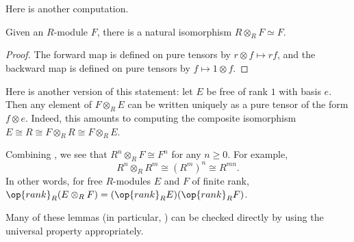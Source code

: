 \documentclass[../notes.tex]{subfiles}
\begin{document}
Here is another computation.
\begin{lemma} \label{lem:tensor-r}
	Given an $R$-module $F$, there is a natural isomorphism $R\otimes_RF\simeq F$.
\end{lemma}
\begin{proof}
	The forward map is defined on pure tensors by $r\otimes f\mapsto rf$, and the backward map is defined on pure tensors by $f\mapsto 1\otimes f$.
\end{proof}
\begin{remark}
	Here is another version of this statement: let $E$ be free of rank $1$ with basis $e$. Then any element of $F\otimes_RE$ can be written uniquely as a pure tensor of the form $f\otimes e$. Indeed, this amounts to computing the composite isomorphism $E\cong R\cong F\otimes_RR\cong F\otimes_RE$.
\end{remark}
\begin{example} \label{ex:tensor-free}
	Combining , we see that $R^n\otimes_RF\cong F^n$ for any $n\ge0$. For example,
	\[R^n\otimes_RR^m\cong\left(R^m\right)^n\cong R^{mn}.\]
	In other words, for free $R$-modules $E$ and $F$ of finite rank, $\op{rank}_R(E\otimes_RF)=(\op{rank}_RE)(\op{rank}_RF)$.
\end{example}
\begin{remark}
	Many of these lemmas (in particular, ) can be checked directly by using the universal property appropriately.
\end{remark}
\end{document}
